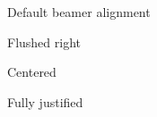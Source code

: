 \documentclass{beamer}
\begin{document}
\begin{frame}{Default beamer alignment}
  \lipsum[1]
\end{frame}

\begin{frame}{Flushed right}

\begin{flushright}
  \lipsum[2]
\end{flushright}

\end{frame}

\begin{frame}{Centered}
\begin{center}
  \lipsum[3]
\end{center}
\end{frame}

\begin{frame}{Fully justified}
  \justifying
  \lipsum[4]
\end{frame}
\end{document}
